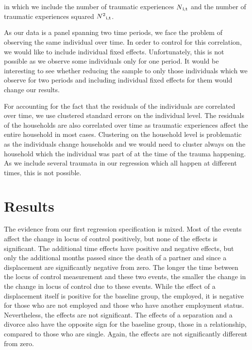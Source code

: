\documentclass[12pt, a4paper, fleqn, parskip]{scrartcl}
\begin{document}
in which we include the number of traumatic experiences $N \textsubscript{i,t}$
and the number of traumatic experiences squared $N
\textsuperscript{2}\textsubscript{i,t}$.

As our data is a panel spanning two time periods, we face the problem of
observing the same individual over time. In order to control for this
correlation, we would like to include individual fixed effects. Unfortunately,
this is not possible as we observe some individuals only for one period. It
would be interesting to see whether reducing the sample to only those
individuals which we observe for two periods and including individual fixed
effects for them would change our results.

For accounting for the fact that the residuals of the individuals are
correlated over time, we use clustered standard errors on the individual level.
The residuals of the households are also correlated over time as traumatic
experiences affect the entire household in most cases. Clustering on the
household level is problematic as the individuals change households and we
would need to cluster always on the household which the individual was part of
at the time of the trauma happening. As we include several traumata in our
regression which all happen at different times, this is not possible.

\section{Results} %
\label{sec:results}

The evidence from our first regression specification is mixed. Most of the
events affect the change in locus of control positively, but none of the
effects is significant. The additional time effects have positive and negative
effects, but only the additional months passed since the death of a partner and
since a displacement are significantly negative from zero. The longer the time
between the locus of control measurement and these two events, the smaller the
change in the change in locus of control due to these events. While the effect
of a displacement itself is positive for the baseline group, the employed, it
is negative for those who are not employed and those who have another
employment status. Nevertheless, the effects are not significant. The effects
of a separation and a divorce also have the opposite sign for the baseline
group, those in a relationship, compared to those who are single. Again, the
effects are not significantly different from zero.
\end{document}
